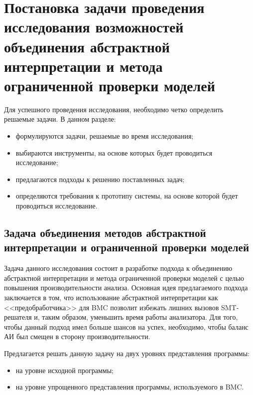 \chapter{Постановка задачи проведения исследования возможностей объединения
абстрактной интерпретации и метода ограниченной проверки моделей}

Для успешного проведения исследования, необходимо четко определить решаемые 
задачи. В данном разделе:
\begin{itemize}
\item формулируются задачи, решаемые во время исследования;
\item выбираются инструменты, на основе которых будет проводиться исследование;
\item предлагаются подходы к решению поставленных задач;
\item определяются требования к прототипу системы, на основе которой будет 
проводиться исследование.
\end{itemize}

\section{Задача объединения методов абстрактной интерпретации и ограниченной 
проверки моделей}

Задача данного исследования состоит в разработке подхода к объединению 
абстрактной интерпретации и метода ограниченной проверки моделей с целью 
повышения производительности анализа. Основная идея предлагаемого подхода 
заключается в том, что использование абстрактной интерпретации как 
<<предобработчика>> для BMC позволит избежать лишних вызовов SMT-решателя и,
таким образом, уменьшить время работы анализатора. Для того, чтобы данный подход
имел больше шансов на успех, необходимо, чтобы баланс АИ был смещен в сторону
производительности.

Предлагается решать данную задачу на двух уровнях представления программы:
\begin{itemize}
\item на уровне исходной программы;
\item на уровне упрощенного представления программы, используемого в BMC.
\end{itemize}

